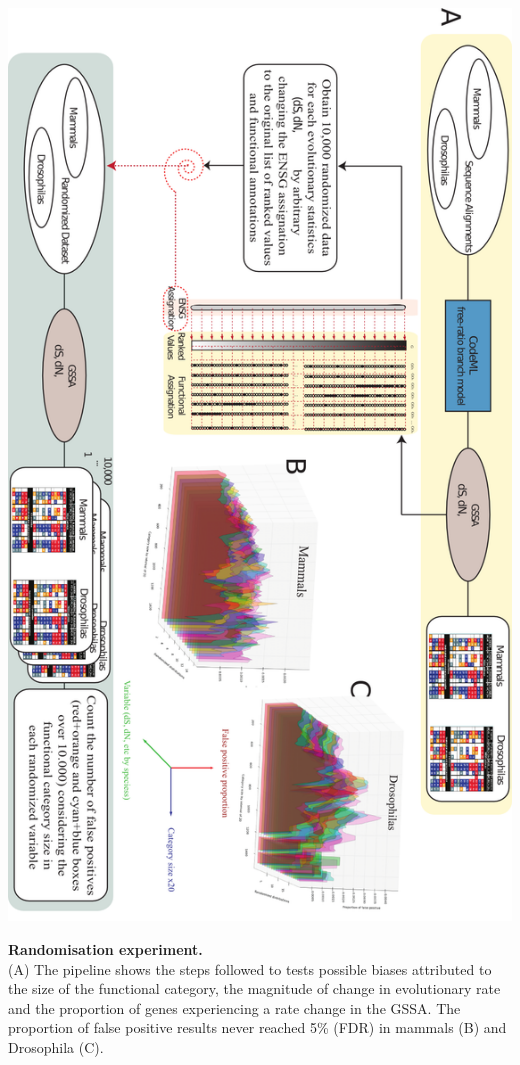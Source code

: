 \begin{FPfigure}
\centering 
\includegraphics[height=\textheight]{tex_source/figures/gssa/gssa_simulations.png}
\caption[Randomisation experiment.]{{\bf Randomisation experiment.} \\(A) The pipeline shows the steps followed to tests possible biases attributed to the size of the functional category, the magnitude of change in evolutionary rate and the proportion of genes experiencing a rate change in the GSSA. The proportion of false positive results never reached 5\% (FDR) in mammals (B) and Drosophila (C).}
\label{fig:gssa_simul}
\end{FPfigure}

